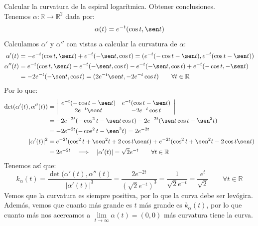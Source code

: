 \begin{ejercicio}
    Calcular la curvatura de la espiral logarítmica. Obtener conclusiones.\\

    \noindent
    Tenemos $\alpha:\mathbb{R}\to \mathbb{R}^2$ dada por:
    \begin{equation*}
        \alpha(t) = e^{-t}(\cos t, \sen t)
    \end{equation*}
    Calculamos $\alpha'$ y $\alpha''$ con vistas a calcular la curvatura de $\alpha$:
    \begin{align*}
        \alpha'(t) &= -e^{-t}(\cos t, \sen t) + e^{-t}(-\sen t, \cos t) = (e^{-t}(-\cos t-\sen t), e^{-t}(\cos t - \sen t)) \\
        \alpha''(t) &= e^{-t}(\cos t, \sen t) - e^{-t}(-\sen t, \cos t) - e^{-t}(-\sen t, \cos t) + e^{-t}(-\cos t, -\sen t) \\
                    &= -2e^{-t}(-\sen t, \cos t) = (2e^{-t}\sen t, -2e^{-t}\cos t) \qquad \forall t\in \mathbb{R}
    \end{align*}
    Por lo que:
    \begin{align*}
        \det(\alpha'(t),\alpha''(t)) &= \left|\begin{array}{cc}
            e^{-t}(-\cos t-\sen t) & e^{-t}(\cos t-\sen t) \\
            2e^{-t}\sen t & -2e^{-t}\cos t  
        \end{array}\right| \\
        &= -2e^{-2t}(-\cos^2t - \sen t\cos t) - 2e^{-2t}(\sen t\cos t - \sen^2t) \\
        &= -2e^{-2t}(-\cos^2t - \sen^2 t) = 2e^{-2t}  \\
            |\alpha'(t)|^2 &= e^{-2t}(\cos^2 t + \sen^2 t + 2\cos t\sen t) + e^{-2t}(\cos^2 t + \sen^2 t - 2\cos t\sen t) \\
                           &= 2e^{-2t} \quad\Longrightarrow\quad |\alpha'(t)| = \sqrt{2}e^{-t}\qquad \forall t\in \mathbb{R} 
    \end{align*}
    Tenemos así que:
    \begin{equation*}
        k_\alpha(t) = \frac{\det(\alpha'(t), \alpha''(t)}{|\alpha'(t)|^3} =  \frac{2e^{-2t}}{{(\sqrt{2}e^{-t})}^{3}} = \frac{1}{\sqrt{2}e^{-t}} = \frac{e^t}{\sqrt{2}} \qquad \forall t\in \mathbb{R}
    \end{equation*}
    Vemos que la curvatura es siempre positiva, por lo que la curva debe ser levógira. Además, vemos que cuanto más grande es $t$ más grande es $k_\alpha(t)$, por lo que cuanto más nos acercamos a $\lim\limits_{t\to\infty} \alpha(t)= (0,0)$ más curvatura tiene la curva.
\end{ejercicio}

